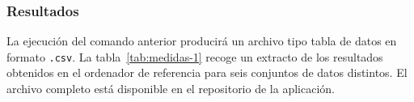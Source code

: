 \subsubsection{Resultados}

La ejecución del comando anterior producirá un archivo tipo tabla de datos en formato \texttt{.csv}. La tabla~\ref{tab:medidas-1} recoge un extracto de los resultados obtenidos en el ordenador de referencia para seis conjuntos de datos distintos. El archivo completo está disponible en el repositorio de la aplicación.

\begin{table}[H]
\caption[Extracto de los resultados de entrenamiento]{Extracto de los resultados de entrenamiento\footnote{\url{https://github.com/l-gonz/tfg-gitt-mlcost/blob/main/model-comp-many.csv}}.}


\end{table}
